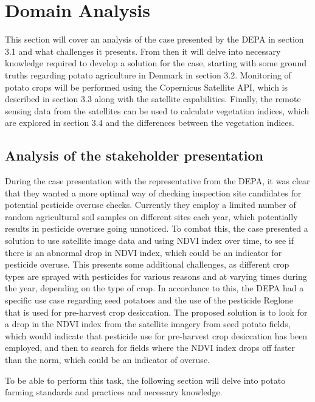 \chapter{\textbf{Domain} Analysis} \label{Analysis}
This section will cover an analysis of the case presented by the \acrshort{DEPA} in section 3.1 and what challenges it presents. From then it will delve into necessary knowledge required to develop a solution for the case, starting with some ground truths regarding potato agriculture in Denmark in section 3.2. Monitoring of potato crops will be performed using the Copernicus Satellite API, which is described in section 3.3 along with the satellite capabilities. Finally, the remote sensing data from the satellites can be used to calculate vegetation indices, which are explored in section 3.4 and the differences between the vegetation indices.

\section{Analysis of the stakeholder presentation} \label{Analysis of the stakeholder presentation}
During the case presentation with the representative from the \acrshort{DEPA}, it was clear that they wanted a more optimal way of checking inspection site candidates for potential pesticide overuse checks. Currently they employ a limited number of random agricultural soil samples on different sites each year\cite{MiljoeOgFoedevareministeriet}, which potentially results in pesticide overuse going unnoticed. To combat this, the case presented a solution to use satellite image data and using NDVI index over time, to see if there is an abnormal drop in NDVI index, which could be an indicator for pesticide overuse.
This presents some additional challenges, as different crop types are sprayed with pesticides for various reasons and at varying times during the year, depending on the type of crop. In accordance to this, the \acrshort{DEPA} had a specific use case regarding seed potatoes and the use of the pesticide Reglone\cite{reglone / case PP} that is used for pre-harvest crop desiccation. The proposed solution is to look for a drop in the NDVI index from the satellite imagery from seed potato fields, which would indicate that pesticide use for pre-harvest crop desiccation has been employed, and then to search for fields where the NDVI index drops off faster than the norm, which could be an indicator of overuse.

To be able to perform this task, the following section will delve into potato farming standards and practices and necessary knowledge.

